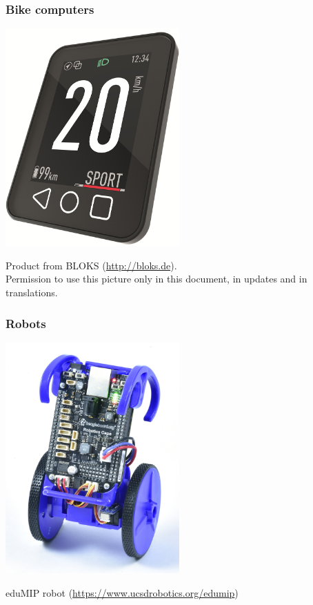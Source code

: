 \begin{frame}
\frametitle{Bike computers}
  \begin{center}
    \includegraphics[width=0.5\textwidth]{slides/sysdev-intro/bike-computer.jpg}
  \end{center}
  \tiny
  Product from BLOKS (\url{http://bloks.de}).\\
  Permission to use this picture only in this document, in updates and
  in translations.
\end{frame}

\begin{frame}
\frametitle{Robots}
  \begin{center}
    \includegraphics[width=0.5\textwidth]{slides/sysdev-intro/beagle-robot.jpg}
  \end{center}
  eduMIP robot (\url{https://www.ucsdrobotics.org/edumip})
\end{frame}

